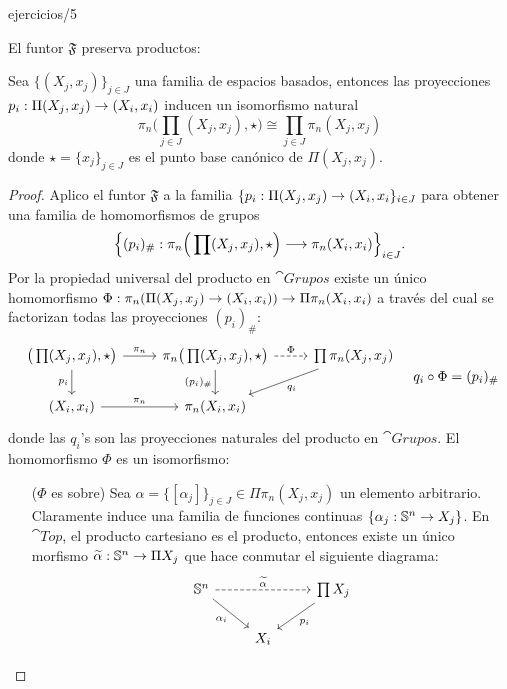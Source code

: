 \documentclass[../../topologia_algebraica]{subfiles}
\begin{document}
{ejercicios/5} %

El funtor $\mathfrak{F}$ preserva productos:

\begin{prop}
  Sea $\{(X_j,x_j)\}_{j\in J}$ una familia de espacios basados, entonces las proyecciones
  $p_i:\Pi (X_j,x_j) \rightarrow (X_i,x_i)$ inducen un isomorfismo natural
  \[
    \pi_n\Big(\prod_{j\in J}(X_j,x_j),\star\Big) \cong \prod_{j\in J}\pi_n(X_j,x_j)
  \]
  donde $\star=\{x_j\}_{j\in J}$ es el punto base can\'onico de $\Pi (X_j,x_j)$.
\end{prop}
\begin{proof}
  Aplico el funtor $\mathfrak{F}$ a la familia $\{p_i:\Pi (X_j,x_j)\rightarrow (X_i,x_i\}_{i\in J}$ para obtener
  una familia de homomorfismos de grupos
  \[
    \Big\{ (p_i)_{\#}: \pi_n \Big(\prod (X_j,x_j) ,\star  \Big) \longrightarrow \pi_n(X_i,x_i) \Big\}_{i\in J}.
  \]
  Por la propiedad universal del producto en $\cat{Grupos}$ existe un \'unico homomorfismo
  $\Phi:\pi_n(\Pi (X_j,x_j)\rightarrow(X_i,x_i))\rightarrow\Pi\pi_n(X_i,x_i)$ a trav\'es del cual se factorizan todas
  las proyecciones $(p_i)_{\#}$:
  \[
    \begin{tikzcd}
      \big(\prod (X_j,x_j),\star\big) \arrow[d,"p_i"'] \arrow[r,"\pi_n"] &
      \pi_n\big(\prod (X_j,x_j),\star\big) \arrow[d,"(p_i)_{\#}"'] \arrow[r,dashed,"\Phi"] &
      \prod \pi_n(X_j,x_j) \arrow[ld,"q_i"] \\
      (X_i,x_i) \arrow[r,"\pi_n"] &
      \pi_n(X_i,x_i) & 
    \end{tikzcd} \quad q_i\circ\Phi =(p_i)_{\#}
  \]
  donde las $q_i$'s son las proyecciones naturales del producto en $\cat{Grupos}$. El homomorfismo
  $\Phi$ es un isomorfismo:
  \begin{enumerate}
  \item[($\Phi$ es sobre)] Sea $\alpha=\{[\alpha_j]\}_{j\in J}\in \Pi \pi_n(X_j,x_j)$ un elemento
    arbitrario. Claramente induce una familia de funciones continuas $\{\alpha_j:\mathbb{S}^n\rightarrow X_j\}$.
    En $\cat{Top}$, el producto cartesiano es el producto, entonces existe un \'unico morfismo
    $\widetilde{\alpha}:\mathbb{S}^n \rightarrow \Pi X_j$ que hace conmutar el siguiente diagrama:
    \[
      \begin{tikzcd}
        \Sn^n \arrow[rr,dashed,"\widetilde{\alpha}"] \arrow[dr,"\alpha_i"'] &&
        \prod X_j \arrow[dl,"p_i"] \\
        & X_i  &
      \end{tikzcd}
    \]


\end{enumerate}
\end{proof}
\end{document}
